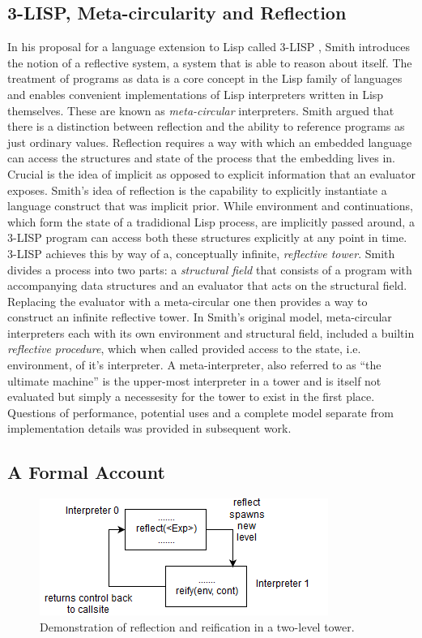 \documentclass[fleqn]{article}
\theoremstyle{definition}
\begin{document}
\subsection{3-LISP, Meta-circularity and Reflection}
In his proposal for a language extension to Lisp called 3-LISP \cite{smith1984reflection}, Smith introduces the notion of a reflective system, a system that is able to reason about itself. The treatment of programs as data is a core concept in the Lisp family of languages and enables  convenient implementations of Lisp interpreters written in Lisp themselves. These are known as \textit{meta-circular} interpreters. Smith argued that there is a distinction between reflection and the ability to reference programs as just ordinary values. Reflection requires a way with which an embedded language can access the structures and state of the process that the embedding lives in. Crucial is the idea of implicit as opposed to explicit information that an evaluator exposes. Smith's idea of reflection is the capability to explicitly instantiate a language construct that was implicit prior. While environment and continuations, which form the state of a tradidional Lisp process, are implicitly passed around, a 3-LISP program can access both these structures explicitly at any point in time. 3-LISP achieves this by way of a, conceptually infinite, \textit{reflective tower}. Smith divides a process into two parts: a \textit{structural field} that consists of a program with accompanying data structures and an evaluator that acts on the structural field. Replacing the evaluator with a meta-circular one then provides a way to construct an infinite reflective tower. In Smith's original model, meta-circular interpreters each with its own environment and structural field, included a builtin \textit{reflective procedure}, which when called provided access to the state, i.e. environment, of it's interpreter. A meta-interpreter, also referred to as ``the ultimate machine'' is the upper-most interpreter in a tower and is itself not evaluated but simply a necessesity for the tower to exist in the first place. Questions of performance, potential uses and a complete model separate from implementation details was provided in subsequent work.
\subsection{A Formal Account}
\begin{figure}[t]
	\centering
	\includegraphics{refl_reif_tower.png}
	\caption{Demonstration of reflection and reification in a two-level tower.}\label{refl_reif_tower}
\end{figure}
\end{document}
